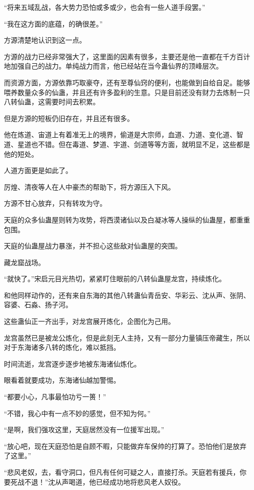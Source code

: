 \begin{this_body}
“将来五域乱战，各大势力恐怕或多或少，也会有一些人道手段罢。”

“我在这方面的底蕴，的确很差。”

方源清楚地认识到这一点。

方源的战力已经非常强大了，这里面的因素有很多，主要还是他一直都在千方百计地加强自己的战力。单纯战力而言，他已经站在当今蛊仙界的顶峰层次。

而资源方面，方源依靠巧取豪夺，还有至尊仙窍的便利，也能做到自给自足。能够喂养数量众多的仙蛊，并且还有许多盈利的生意。只是目前还没有财力去炼制一只八转仙蛊，这需要时间去积累。

但是方源的短板仍旧存在，并且还有很多。

他在炼道、宙道上有着准无上的境界，偷道是大宗师，血道、力道、变化道、智道、星道也不错。但在毒道、梦道、宇道、剑道等等方面，就明显不足，这些都是他的短处。

人道方面更是如此了。

厉煌、清夜等人在人中豪杰的帮助下，将方源压入下风。

方源不甘心放弃，只有转攻为守。

天庭的众多仙蛊屋则转为攻势，将西漠诸仙以及白凝冰等人操纵的仙蛊屋，都重重包围。

天庭的仙蛊屋战力暴涨，并不担心这些敌对仙蛊屋的突围。

藏龙窟战场。

“就快了。”宋启元目光热切，紧紧盯住眼前的八转仙蛊屋龙宫，持续炼化。

和他同样动作的，还有来自东海的其他八转蛊仙青岳安、华彩云、沈从声、张阴、容婆、石淼、扬子河。

这些蛊仙正一齐出手，对龙宫展开炼化，企图化为己用。

龙宫虽然已是被龙公炼化，但是此刻无人主持，又有一部分力量镇压帝藏生，所以对于东海诸多八转的炼化，难以抵挡。

时间流逝，龙宫逐步逐步地被东海诸仙炼化。

眼看着就要成功，东海诸仙越加警惕。

“都要小心，凡事最怕功亏一篑！”

“不错，我心中有一点不妙的感觉，但不知为何。”

“是啊，我们强攻这里，天庭居然没有一位援军出现。”

“放心吧，现在天庭恐怕是自顾不暇，只能做弃车保帅的打算了。恐怕他们是放弃了这里。”

“悲风老奴，去，看守洞口，但凡有任何可疑之人，直接打杀。天庭若有援兵，你要死战不退！”沈从声喝道，他已经成功地将悲风老人奴役。


\end{this_body}
